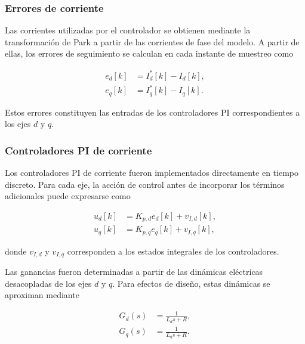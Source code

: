 \subsubsection{Errores de corriente}
\label{subsubsec:errores_corriente}

Las corrientes utilizadas por el controlador se obtienen mediante la
transformación de Park a partir de las corrientes de fase del modelo.
A partir de ellas, los errores de seguimiento se calculan en cada
instante de muestreo como

\begin{align}
e_d[k]
&=
I_d^{*}[k]-I_d[k],
\label{eq:error_corriente_d}
\\
e_q[k]
&=
I_q^{*}[k]-I_q[k].
\label{eq:error_corriente_q}
\end{align}

Estos errores constituyen las entradas de los controladores PI
correspondientes a los ejes $d$ y $q$.


\subsubsection{Controladores PI de corriente}
\label{subsubsec:pi_corriente}

Los controladores PI de corriente fueron implementados directamente
en tiempo discreto. Para cada eje, la acción de control antes de
incorporar los términos adicionales puede expresarse como

\begin{align}
u_d[k]
&=
K_{p,d}e_d[k]+v_{I,d}[k],
\label{eq:pi_d_discreto}
\\
u_q[k]
&=
K_{p,q}e_q[k]+v_{I,q}[k],
\label{eq:pi_q_discreto}
\end{align}

donde $v_{I,d}$ y $v_{I,q}$ corresponden a los estados integrales de
los controladores.

Las ganancias fueron determinadas a partir de las dinámicas
eléctricas desacopladas de los ejes $d$ y $q$. Para efectos de diseño,
estas dinámicas se aproximan mediante

\begin{align}
G_d(s)
&=
\frac{1}{L_d s+R},
\\
G_q(s)
&=
\frac{1}{L_q s+R}.
\end{align}

